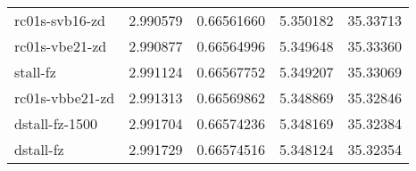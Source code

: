 \begin{table}
\begin{tabular}{|l|l|l|l|l|}
		\rowcolor{lightgray}
     rc01s-svb16-zd    &2.990579  & 0.66561660 & 5.350182 & 35.33713\\
		\rowcolor{lightgray}
      rc01s-vbe21-zd    &2.990877  & 0.66564996 & 5.349648 & 35.33360\\
		\rowcolor{lightgray}
           stall-fz    &2.991124  & 0.66567752 & 5.349207 & 35.33069\\
		\rowcolor{lightgray}
    rc01s-vbbe21-zd    &2.991313  & 0.66569862 & 5.348869 & 35.32846\\
		\rowcolor{lightgray}
     dstall-fz-1500    &2.991704  & 0.66574236 & 5.348169 & 35.32384\\
		\rowcolor{lightgray}
          dstall-fz    &2.991729  & 0.66574516 & 5.348124 & 35.32354\\
	\hline
    \end{tabular}
\end{table}
